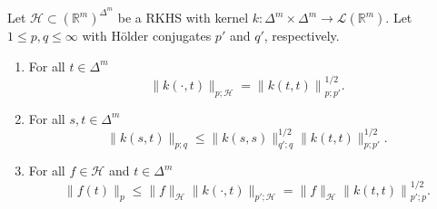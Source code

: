 \documentclass{article}
\begin{document}
\begin{lemma}\label{lemma:rkhs_properties}
  Let $\mathcal{H} \subset {(\mathbb{R}^m)}^{\Delta^m}$ be a RKHS with kernel
  $k \colon \Delta^m \times \Delta^m \to \mathcal{L}(\mathbb{R}^m)$. Let
  $1\leq p, q \leq \infty$ with Hölder conjugates $p'$ and $q'$, respectively.

  \begin{enumerate}
  \item For all $t \in \Delta^m$
    \begin{equation}\label{eq:rkhs_kernel}
      \|k(\cdot, t)\|_{p;\mathcal{H}} = {\|k(t,t)\|}^{1/2}_{p;p'}.
    \end{equation}
  \item For all $s, t \in \Delta^m$
    \begin{equation}\label{eq:rkhs_st_bound}
      \|k(s,t)\|_{p;q} \leq \|k(s,s)\|_{q';q}^{1/2} \|k(t,t)\|_{p;p'}^{1/2}.
    \end{equation}
  \item For all $f \in \mathcal{H}$ and $t \in \Delta^m$
    \begin{equation}\label{eq:rkhs_bound}
      \|f(t)\|_p \leq \|f\|_{\mathcal{H}} \|k(\cdot, t)\|_{p';\mathcal{H}} = \|f\|_{\mathcal{H}} {\|k(t,t)\|}^{1/2}_{p';p}.
    \end{equation}
  \end{enumerate}
\end{lemma}
\end{document}
